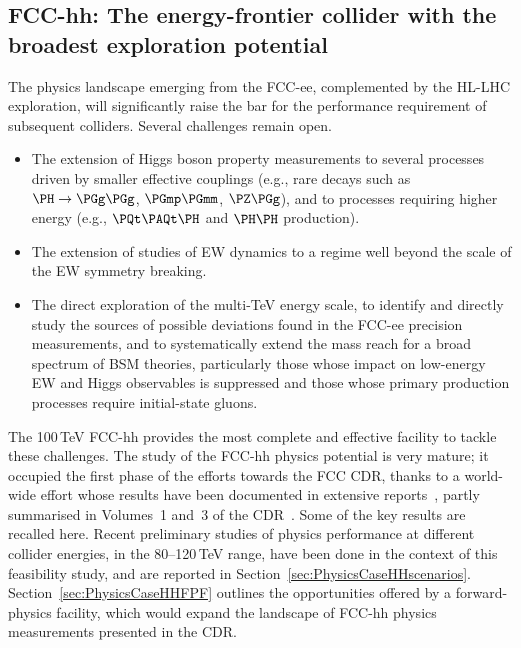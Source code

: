 \subsection{FCC-hh: The energy-frontier collider with the broadest exploration potential}

The physics landscape emerging from the FCC-ee, complemented by the HL-LHC exploration, will significantly raise the bar for the performance requirement of subsequent colliders. 
Several challenges remain open.

\begin{itemize}
\item The extension of Higgs boson property measurements to several processes driven by smaller effective couplings 
(e.g., rare decays such as $\PH \to \PGg\PGg$, $\PGmp\PGmm$, $\PZ\PGg$), 
and to processes requiring higher energy (e.g., $\PQt\PAQt\PH$ and $\PH\PH$ production).
\item The extension of studies of EW dynamics to a regime well beyond the scale of the EW symmetry breaking.
\item The direct exploration of the multi-TeV energy scale, 
to identify and directly study the sources of possible deviations found in the FCC-ee precision measurements, 
and to systematically extend the mass reach for a broad spectrum of BSM theories, 
particularly those whose impact on low-energy EW and Higgs observables is suppressed and those whose primary production processes require initial-state gluons.
\end{itemize}

The 100\,TeV FCC-hh provides the most complete and effective facility to tackle these challenges. 
The study of the FCC-hh physics potential is very mature; it occupied the first phase of the efforts towards the FCC CDR, thanks to a world-wide effort whose results have been documented in extensive reports~\cite{Arkani-Hamed:2015vfh,Mangano:2017tke}, partly summarised in Volumes~1 and~3 of the CDR~\cite{fcc-phys-cdr,FCC-hhCDR}. 
Some of the key results are recalled here. 
Recent preliminary studies of physics performance at different collider energies, in the \mbox{80--120}\,TeV range, have been done in the context of this feasibility study, and are reported in Section~\ref{sec:PhysicsCaseHHscenarios}. 
Section~\ref{sec:PhysicsCaseHHFPF} outlines the opportunities offered by a forward-physics facility, which would expand the landscape of FCC-hh physics measurements presented in the CDR.  



